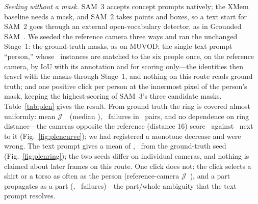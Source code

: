 \documentclass[journal]{IEEEtran}
\newcommand{\Jscore}{\ensuremath{\mathcal{J}}}
\begin{document}
\textit{Seeding without a mask.} SAM~3 accepts concept prompts natively;
the XMem baseline needs a mask, and SAM~2 takes points and boxes, so a text
start for SAM~2 goes through an external open-vocabulary detector, as in
Grounded SAM~\cite{groundedsam}. We seeded the reference
camera three ways and ran the unchanged Stage~1: the ground-truth masks, as on
MUVOD; the single text prompt ``person,'' whose \plenTxtInstances\ instances are
matched to the six people once, on the reference camera, by IoU with its
annotation and for scoring only---the identities then travel with the masks
through Stage~1, and nothing on this route reads ground truth; and one positive click per person at the
innermost pixel of the person's mask, keeping the highest-scoring of SAM~3's
three candidate masks. Table~\ref{tab:plen} gives the result. From ground
truth the ring is covered almost uniformly: mean \Jscore\ \plenJgt\ (median
\plenJgtMed), \plenFailGt\ failures in \plenPairs\ pairs, and no dependence on
ring distance---the cameras opposite the reference (distance 16) score
\plenJdSixteen\ against \plenJdOne\ next to it (Fig.~\ref{fig:plencurve}); we
had registered a monotone decrease and were wrong. The text prompt gives a mean of
\plenJtxt, \plenDeltaTxt\ from the ground-truth seed (Fig.~\ref{fig:plenring});
the two seeds differ on individual cameras, and nothing is claimed about later
frames on this route. One click does not: the
click selects a shirt or a torso as often as the person (reference-camera
\Jscore\ \plenSeedJpt), and a part propagates as a part (\plenJpt,
\plenFailPt\ failures)---the part/whole ambiguity that the text prompt
resolves.
\end{document}
